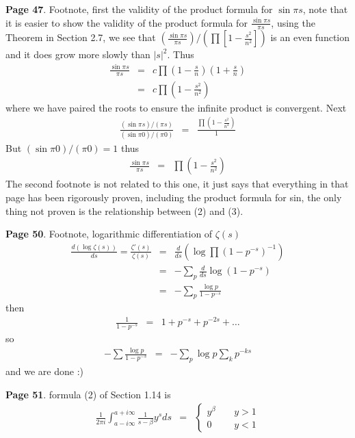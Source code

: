 \documentclass[aps,preprint,preprintnumbers,nofootinbib,showpacs,prd]{revtex4-1}
\newcommand{\nbea}{\begin{eqnarray*}}
\newcommand{\neea}{\end{eqnarray*}}
\begin{document}
{\bf Page 47}. Footnote, first the validity of the product formula for $\sin \pi s$, note that it is easier to show the validity of the product formula for $\frac{\sin \pi s}{\pi s}$, using the Theorem in Section 2.7, we see that $\left (\frac{\sin \pi s}{\pi s}\right )/\left (\prod \left \lbrack 1 - \frac{s^2}{n^2}\right \rbrack \right )$ is an even function and it does grow more slowly than $|s|^2$. Thus
%
\nbea
\frac{\sin \pi s}{\pi s} & = & c \prod \left ( 1 - \frac{s}{n} \right ) \left ( 1 + \frac{s}{n} \right ) \\
& = & c \prod \left ( 1 - \frac{s^2}{n^2} \right )
\neea
%
where we have paired the roots to ensure the infinite product is convergent. Next
%
\nbea
\frac{(\sin \pi s)/(\pi s)}{(\sin \pi 0)/(\pi 0)} & = & \frac{\prod \left ( 1 - \frac{s^2}{n^2} \right )}{1}
\neea
%
But $(\sin \pi 0)/(\pi 0) = 1$ thus
%
\nbea
\frac{\sin \pi s}{\pi s} & = & \prod \left ( 1 - \frac{s^2}{n^2} \right )
\neea
%
The second footnote is not related to this one, it just says that everything in that page has been rigorously proven, including the product formula for sin, the only thing not proven is the relationship between (2) and (3).

{\bf Page 50}. Footnote, logarithmic differentiation of $\zeta(s)$
%
\nbea
\frac{d(\log \zeta(s))}{ds} = \frac{\zeta'(s)}{\zeta(s)} & = & \frac{d}{ds} \left ( \log\prod (1 - p^{-s})^{-1}\right ) \\
& = & -\sum_p \frac{d}{ds} \log(1 - p^{-s}) \\
& = & -\sum_p \frac{\log p}{1 - p^{-s}}
\neea
%
then
%
\nbea
\frac{1}{1 - p^{-s}} & = & 1 + p^{-s} + p^{-2s} + \dots
\neea
%
so
%
\nbea
-\sum \frac{\log p}{1 - p^{-s}} & = & -\sum_p \log p \sum_k p^{-ks}
\neea
%
and we are done :)

{\bf Page 51}. formula (2) of Section 1.14 is
%
\nbea
\frac{1}{2\pi i} \int_{a - i\infty}^{a + i\infty} \frac{1}{s - \beta} y^s ds & = & \left \{
\begin{array}{ll}
y^\beta &~~~~~ y > 1 \\
0 &~~~~~ y < 1
\end{array}
\right.
\neea
%
\end{document}
